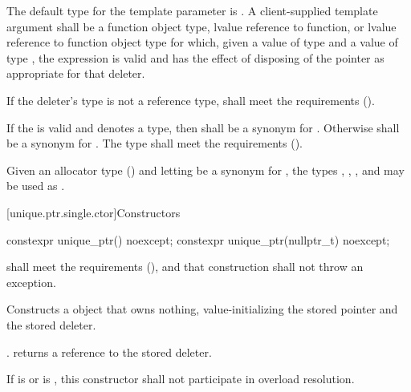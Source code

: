 \pnum
The default type for the template parameter  is
. A client-supplied template argument
 shall be a function
object type, lvalue reference to function, or
lvalue reference to function object type
for which, given
a value  of type  and a value
 of type , the expression
 is valid and has the effect of disposing of the
pointer as appropriate for that deleter.

\pnum
If the deleter's type  is not a reference type,  shall meet
the  requirements ().

\pnum
If the   is valid and denotes a
type, then  shall be a synonym for . Otherwise
 shall be a synonym for . The type  shall
meet the  requirements ().

\pnum
\begin{example}
Given an allocator type  () and
letting  be a synonym for , the types ,
, , and 
may be used as .
\end{example}

[unique.ptr.single.ctor]{Constructors}

%
\begin{itemdecl}
constexpr unique_ptr() noexcept;
constexpr unique_ptr(nullptr_t) noexcept;
\end{itemdecl}

\begin{itemdescr}
\pnum
\requires {} shall
meet the  requirements (),
and that construction shall not throw an exception.

\pnum
\effects
Constructs a  object that owns
nothing, value-initializing the stored pointer and the stored deleter.

\pnum
\ensures
{}. 
returns a reference to the stored deleter.

\pnum
\remarks
If  is  or
 is ,
this constructor shall not participate in overload resolution.
\end{itemdescr}

